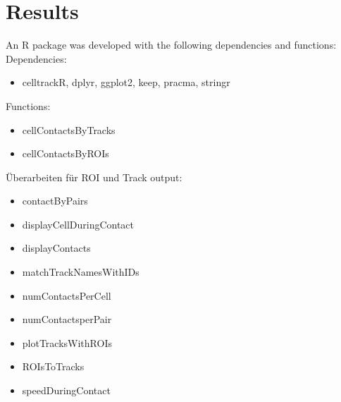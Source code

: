 \documentclass{report}
\begin{document}
\chapter{Results}

An R package was developed with the following dependencies and functions:\\

Dependencies:
\begin{itemize}
 \item celltrackR,
    dplyr,
    ggplot2,
    keep,
    pracma,
    stringr
\end{itemize}

Functions:
\begin{itemize}
	\item cellContactsByTracks
	\item cellContactsByROIs
\end{itemize}

Überarbeiten für ROI und Track output:
\begin{itemize}
	\item contactByPairs
	\item displayCellDuringContact
	\item displayContacts
	\item matchTrackNamesWithIDs
	\item numContactsPerCell
	\item numContactsperPair
	\item plotTracksWithROIs
	\item ROIsToTracks
	\item speedDuringContact
\end{itemize}


%
%
%
%



%
%
%
%
%
%
%
% 
\end{document}
